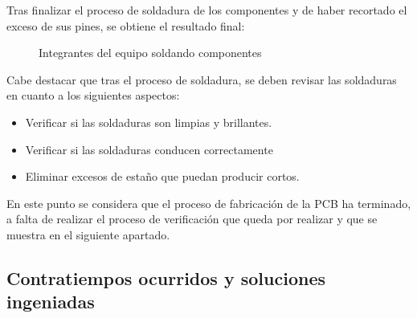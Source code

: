 \begin{itemize}
    Tras finalizar el proceso de soldadura de los componentes y de haber recortado el exceso de sus pines, se obtiene el resultado final:

    
    \begin{figure}[H]
    \centering
    \caption{Integrantes del equipo soldando componentes}
    \label{fig:lego}
    \end{figure}
    
    Cabe destacar que tras el proceso de soldadura, se deben revisar las soldaduras en cuanto a los siguientes aspectos:
    \begin{itemize}
        \item Verificar si las soldaduras son limpias y brillantes.
        \item Verificar si las soldaduras conducen correctamente
        \item Eliminar excesos de estaño que puedan producir cortos.
    \end{itemize}
\end{itemize}

En este punto se considera que el proceso de fabricación de la PCB ha terminado, a falta de realizar el proceso de verificación que queda por realizar y que se muestra en el siguiente apartado.


\subsection{Contratiempos ocurridos y soluciones ingeniadas}



